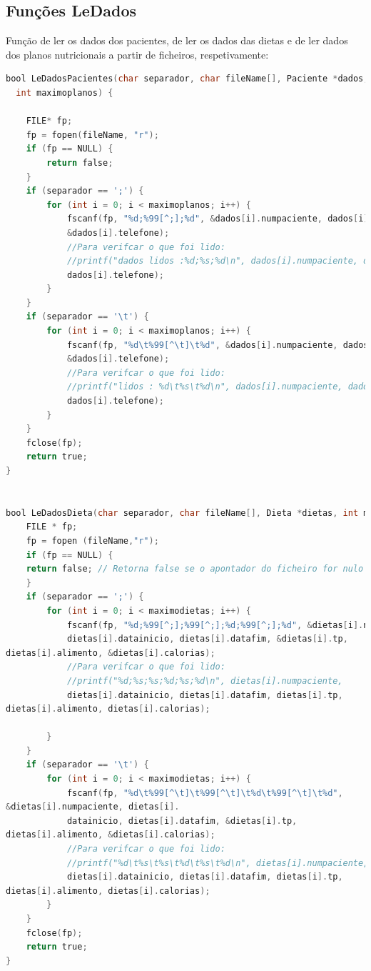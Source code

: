 \documentclass[a4wide]{report}
\begin{document}
\newpage
\subsection{Funções LeDados}
\Large

Função de ler os dados dos pacientes, de ler os dados das dietas e de ler dados dos planos nutricionais a partir de ficheiros, respetivamente:

\begin{lstlisting}[language=C, caption={Funções de ler dados}, label={lst:exemplo-c}]
bool LeDadosPacientes(char separador, char fileName[], Paciente *dados,
  int maximoplanos) {

    FILE* fp;
    fp = fopen(fileName, "r");
    if (fp == NULL) {
        return false;
    }
    if (separador == ';') {
        for (int i = 0; i < maximoplanos; i++) {
            fscanf(fp, "%d;%99[^;];%d", &dados[i].numpaciente, dados[i].nome,
            &dados[i].telefone);
            //Para verifcar o que foi lido:
            //printf("dados lidos :%d;%s;%d\n", dados[i].numpaciente, dados[i].nome,
            dados[i].telefone);
        }
    }
    if (separador == '\t') {
        for (int i = 0; i < maximoplanos; i++) {
            fscanf(fp, "%d\t%99[^\t]\t%d", &dados[i].numpaciente, dados[i].nome,
            &dados[i].telefone);
            //Para verifcar o que foi lido:
            //printf("lidos : %d\t%s\t%d\n", dados[i].numpaciente, dados[i].nome,
            dados[i].telefone);
        }
    }
    fclose(fp);
    return true;
}


bool LeDadosDieta(char separador, char fileName[], Dieta *dietas, int maximodietas) {
    FILE * fp;
    fp = fopen (fileName,"r");
    if (fp == NULL) {
    return false; // Retorna false se o apontador do ficheiro for nulo
    }
    if (separador == ';') {
        for (int i = 0; i < maximodietas; i++) {
            fscanf(fp, "%d;%99[^;];%99[^;];%d;%99[^;];%d", &dietas[i].numpaciente,
            dietas[i].datainicio, dietas[i].datafim, &dietas[i].tp,
dietas[i].alimento, &dietas[i].calorias);
            //Para verifcar o que foi lido:
            //printf("%d;%s;%s;%d;%s;%d\n", dietas[i].numpaciente,
            dietas[i].datainicio, dietas[i].datafim, dietas[i].tp,
dietas[i].alimento, dietas[i].calorias);

        }
    }
    if (separador == '\t') {
        for (int i = 0; i < maximodietas; i++) {
            fscanf(fp, "%d\t%99[^\t]\t%99[^\t]\t%d\t%99[^\t]\t%d",
&dietas[i].numpaciente, dietas[i].
            datainicio, dietas[i].datafim, &dietas[i].tp,
dietas[i].alimento, &dietas[i].calorias);
            //Para verifcar o que foi lido:
            //printf("%d\t%s\t%s\t%d\t%s\t%d\n", dietas[i].numpaciente,
            dietas[i].datainicio, dietas[i].datafim, dietas[i].tp,
dietas[i].alimento, dietas[i].calorias);
        }
    }
    fclose(fp);
    return true;
}


\end{lstlisting}
\end{document}
